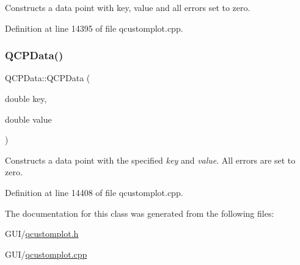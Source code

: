 Constructs a data point with key, value and all errors set to zero. 

Definition at line 14395 of file qcustomplot.\+cpp.

\mbox{\label{class_q_c_p_data_aa274181ae8de2a0907ba5464d3c2c103}} 
\subsubsection{\texorpdfstring{Q\+C\+P\+Data()}{QCPData()}\hspace{0.1cm}{\footnotesize\ttfamily [2/2]}}
{\footnotesize\ttfamily Q\+C\+P\+Data\+::\+Q\+C\+P\+Data (\begin{DoxyParamCaption}\item[{double}]{key,  }\item[{double}]{value }\end{DoxyParamCaption})}

Constructs a data point with the specified {\itshape key} and {\itshape value}. All errors are set to zero. 

Definition at line 14408 of file qcustomplot.\+cpp.



The documentation for this class was generated from the following files\+:\begin{DoxyCompactItemize}
\item 
G\+U\+I/\hyperlink{qcustomplot_8h}{qcustomplot.\+h}\item 
G\+U\+I/\hyperlink{qcustomplot_8cpp}{qcustomplot.\+cpp}\end{DoxyCompactItemize}
